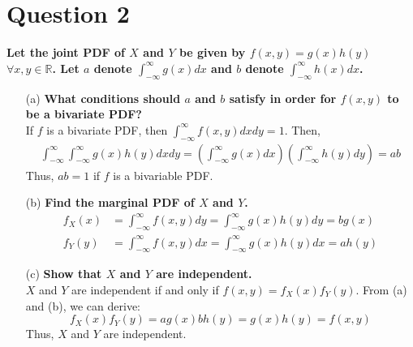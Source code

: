 \documentclass{article}
\newcommand{\R}{\mathbb{R}}
\newcommand{\intinf}{\int_{-\infty}^{\infty}}
\begin{document}
\section*{Question 2}
\textbf{Let the joint PDF of $X$ and $Y$ be given by $f(x,y)=g(x)h(y)$ $\forall x,y\in\R$. Let $a$ denote $\intinf g(x)dx$ and $b$ denote $\intinf h(x)dx$.}
\begin{itemize}
	\item[(a)] \textbf{What conditions should $a$ and $b$ satisfy in order for $f(x,y)$ to be a bivariate PDF?}
	\medskip \\
	If $f$ is a bivariate PDF, then $\intinf f(x,y)dxdy=1$. Then,
	\begin{align*}
		\intinf\intinf g(x)h(y)dxdy = \left( \intinf g(x)dx \right)\left( \intinf h(y)dy \right) = ab
	\end{align*}
	Thus, $ab=1$ if $f$ is a bivariable PDF.
	
	\item[(b)] \textbf{Find the marginal PDF of $X$ and $Y$.}
	\begin{align*}
		f_X(x) &= \intinf f(x,y)dy = \intinf g(x)h(y)dy = bg(x)	\\
		f_Y(y) &= \intinf f(x,y)dx = \intinf g(x)h(y)dx = ah(y)	
	\end{align*}

	\item[(c)] \textbf{Show that $X$ and $Y$ are independent.}
	\bigskip \\
	$X$ and $Y$ are independent if and only if $f(x,y)=f_X(x)f_Y(y)$. From (a) and (b), we can derive:
	\[
		f_X(x)f_Y(y) = ag(x)bh(y) = g(x)h(y) = f(x,y)
	\]
	Thus, $X$ and $Y$ are independent.
	
\end{itemize}


\end{document}
